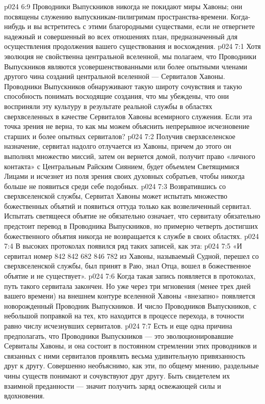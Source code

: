 \vs p024 6:9 \pc Проводники Выпускников никогда не покидают миры Хавоны; они посвящены служению выпускникам\hyp{}пилигримам пространства\hyp{}времени. Когда\hyp{}нибудь и вы встретитесь с этими благородными существами, если не отвергнете надежный и совершенный во всех отношениях план, предназначенный для осуществления продолжения вашего существования и восхождения.
\vs p024 7:1 Хотя эволюция не свойственна центральной вселенной, мы полагаем, что Проводники Выпускников являются усовершенствованными или более опытными членами другого чина созданий центральной вселенной --- Сервиталов Хавоны. Проводники Выпускников обнаруживают такую широту сочувствия и такую способность понимать восходящие создания, что мы убеждены, что они восприняли эту культуру в результате реальной службы в областях сверхвселенных в качестве Сервиталов Хавоны всемирного служения. Если эта точка зрения не верна, то как мы можем объяснить непрерывное исчезновение старших и более опытных сервиталов?
\vs p024 7:2 Получив сверхвселенское назначение, сервитал надолго отлучается из Хавоны, причем до этого он выполнял множество миссий, затем он вернется домой, получит право «личного контакта» с Центральным Райским Сиянием, будет объемлем Светящимися Лицами и исчезнет из поля зрения своих духовных собратьев, чтобы никогда больше не появиться среди себе подобных.
\vs p024 7:3 Возвратившись со сверхвселенской службы, Сервитал Хавоны может испытать множество божественных объятий и появиться оттуда только как возвеличенный сервитал. Испытать светящееся объятие не обязательно означает, что сервиталу обязательно предстоит перевод в Проводника Выпускников, но примерно четверть достигших божественного объятия никогда не возвращается к службе в своих областях.
\vs p024 7:4 \pc В высоких протоколах появился ряд таких записей, как эта:
\vs p024 7:5 «И сервитал номер 842 842 682 846 782 из Хавоны, называемый Судной, перешел со сверхвселенской службы, был принят в Раю, знал Отца, вошел в божественное объятие и не существует».
\vs p024 7:6 Когда такая запись появляется в протоколах, путь такого сервитала закончен. Но уже через три мгновения (менее трех дней вашего времени) на внешнем контуре вселенной Хавоны «внезапно» появляется новорожденный Проводник Выпускников. И число Проводников Выпускников, с небольшой поправкой на тех, кто находится в процессе перехода, в точности равно числу исчезнувших сервиталов.
\vs p024 7:7 \pc Есть и еще одна причина предполагать, что Проводники Выпускников --- это эволюционировавшие Сервиталы Хавоны, и она состоит в постоянном стремлении этих проводников и связанных с ними сервиталов проявлять весьма удивительную привязанность друг к другу. Совершенно необъяснимо, как эти, по общему мнению, раздельные чины существ понимают и сочувствуют друг другу. Быть свидетелем их взаимной преданности --- значит получить заряд освежающей силы и вдохновения.
